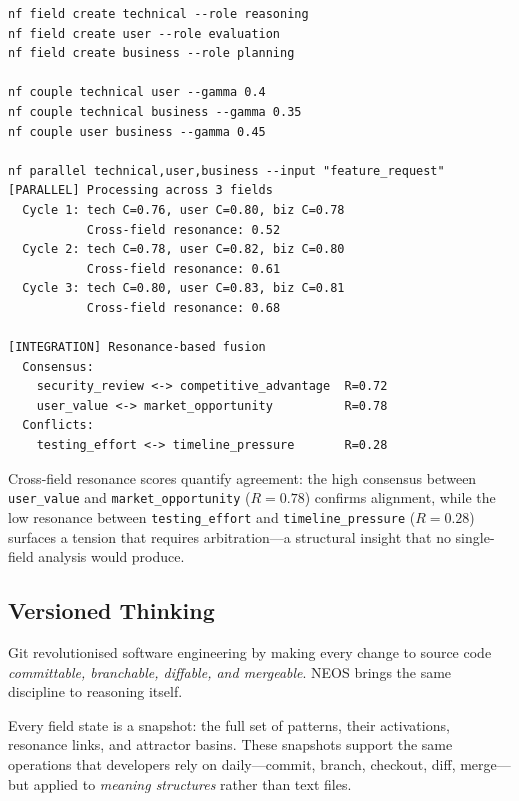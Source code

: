 \begin{terminalbox}
\begin{lstlisting}[style=neosshell]
nf field create technical --role reasoning
nf field create user --role evaluation
nf field create business --role planning

nf couple technical user --gamma 0.4
nf couple technical business --gamma 0.35
nf couple user business --gamma 0.45

nf parallel technical,user,business --input "feature_request"
[PARALLEL] Processing across 3 fields
  Cycle 1: tech C=0.76, user C=0.80, biz C=0.78
           Cross-field resonance: 0.52
  Cycle 2: tech C=0.78, user C=0.82, biz C=0.80
           Cross-field resonance: 0.61
  Cycle 3: tech C=0.80, user C=0.83, biz C=0.81
           Cross-field resonance: 0.68

[INTEGRATION] Resonance-based fusion
  Consensus:
    security_review <-> competitive_advantage  R=0.72
    user_value <-> market_opportunity          R=0.78
  Conflicts:
    testing_effort <-> timeline_pressure       R=0.28
\end{lstlisting}
\end{terminalbox}

\noindent
Cross-field resonance scores quantify agreement: the high consensus
between \texttt{user\_value} and \texttt{market\_opportunity} ($R=0.78$)
confirms alignment, while the low resonance between
\texttt{testing\_effort} and \texttt{timeline\_pressure} ($R=0.28$)
surfaces a tension that requires arbitration---a structural insight
that no single-field analysis would produce.

\subsection{Versioned Thinking}\label{sec:versioning}

Git revolutionised software engineering by making every change to
source code \emph{committable, branchable, diffable, and mergeable}.
NEOS brings the same discipline to reasoning itself.

Every field state is a snapshot: the full set of patterns, their
activations, resonance links, and attractor basins.  These snapshots
support the same operations that developers rely on daily---commit,
branch, checkout, diff, merge---but applied to \emph{meaning
structures} rather than text files.


